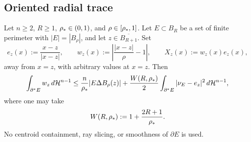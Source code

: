 \subsection{Oriented radial trace}
\label{ssec:fjbridge-radial-trace}

\begin{theorem}
\label{thm:fjbridge-radial-trace}
Let \(n\ge2\), \(R\ge1\), \(\rho_*\in(0,1)\), and
\(\rho\in[\rho_*,1]\).  Let \(E\subset B_R\) be a set of finite
perimeter with \(|E|=|B_\rho|\), and let \(z\in\overline{B_{R+1}}\).
Set
\[
   e_z(x):=\frac{x-z}{|x-z|},
   \qquad
   w_z(x):=\left|\frac{|x-z|}{\rho}-1\right|,
   \qquad
   X_z(x):=w_z(x)e_z(x),
\]
away from \(x=z\), with arbitrary values at \(x=z\).  Then
\[
   \int_{\partial^*E}w_z\,d\mathcal H^{n-1}
   \le
   \frac{n}{\rho_*}|E\Delta B_\rho(z)|
   +\frac{W(R,\rho_*)}{2}
      \int_{\partial^*E}|\nu_E-e_z|^2\,d\mathcal H^{n-1},
\]
where one may take
\[
   W(R,\rho_*):=1+\frac{2R+1}{\rho_*}.
\]
No centroid containment, ray slicing, or smoothness of
\(\partial E\) is used.
\end{theorem}

